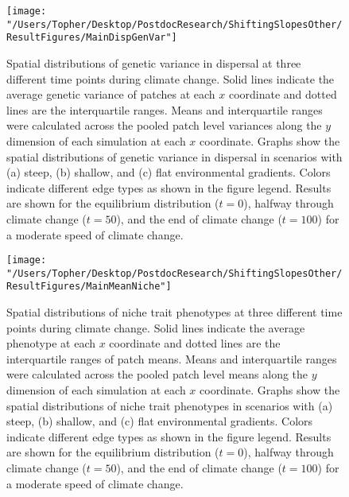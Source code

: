 \documentclass[11pt]{article}
\begin{document}
\clearpage
\begin{figure}[h!]
\texttt{[image: "/Users/Topher/Desktop/PostdocResearch/ShiftingSlopesOther/ResultFigures/MainDispGenVar"]}
\caption{Spatial distributions of genetic variance in dispersal at three different time points during climate change. Solid lines indicate the average genetic variance of patches at each $x$ coordinate and dotted lines are the interquartile ranges. Means and interquartile ranges were calculated across the pooled patch level variances along the $y$ dimension of each simulation at each $x$ coordinate. Graphs show the spatial distributions of genetic variance in dispersal in scenarios with (a) steep, (b) shallow, and (c) flat environmental gradients. Colors indicate different edge types as shown in the figure legend. Results are shown for the equilibrium distribution ($t = 0$), halfway through climate change ($t = 50$), and the end of climate change ($t = 100$) for a moderate speed of climate change.}
\label{fig:DispGenVar}
\end{figure}

\clearpage

\begin{figure}[h!]
\texttt{[image: "/Users/Topher/Desktop/PostdocResearch/ShiftingSlopesOther/ResultFigures/MainMeanNiche"]}
\caption{Spatial distributions of niche trait phenotypes at three different time points during climate change. Solid lines indicate the average phenotype at each $x$ coordinate and dotted lines are the interquartile ranges of patch means. Means and interquartile ranges were calculated across the pooled patch level means along the $y$ dimension of each simulation at each $x$ coordinate. Graphs show the spatial distributions of niche trait phenotypes in scenarios with (a) steep, (b) shallow, and (c) flat environmental gradients. Colors indicate different edge types as shown in the figure legend. Results are shown for the equilibrium distribution ($t = 0$), halfway through climate change ($t = 50$), and the end of climate change ($t = 100$) for a moderate speed of climate change.}
\label{fig:MeanNiche}
\end{figure}

\clearpage
\end{document}
